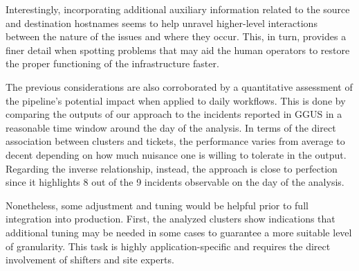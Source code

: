 
Interestingly, incorporating additional auxiliary information related to the source and destination hostnames seems to help unravel higher-level interactions between the nature of the issues and where they occur.
This, in turn, provides a finer detail when spotting problems that may aid the human operators to restore the proper functioning of the infrastructure faster.

The previous considerations are also corroborated by a quantitative assessment of the pipeline's potential impact when applied to daily workflows. This is done by comparing the outputs of our approach to the incidents reported in GGUS in a reasonable time window around the day of the analysis.
In terms of the direct association between clusters and tickets, the performance varies from average to decent depending on how much nuisance one is willing to tolerate in the output.
Regarding the inverse relationship, instead, the approach is close to perfection since it highlights 8 out of the 9 incidents observable on the day of the analysis. 

Nonetheless, some adjustment and tuning would be helpful prior to full integration into production.
First, the analyzed clusters show indications that additional tuning may be needed in some cases to guarantee a more suitable level of granularity.
This task is highly application-specific and requires the direct involvement of shifters and site experts.

